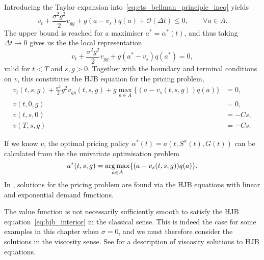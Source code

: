 \documentclass[main.tex]{subfiles}
\begin{document}
Introducing the Taylor expansion into~\eqref{eq:cts_bellman_principle_ineq}
yields
\begin{equation}
  v_t
  +{\textstyle\frac{\sigma^2g^2}{2}}
  v_{gg}+
  g(a-v_s)q(a)
  +\mathcal{O}(\Delta{t})\leq 0,\qquad \forall a\in A.
\end{equation}
The upper bound is reached for a maximiser $a^*=\alpha^*(t)$, and thus
taking $\Delta{t}\to 0$ gives us the the local representation
\begin{equation}
  v_t+\frac{\sigma^2g^2}{2}v_{gg}
  + g(a^*-v_s)q(a^*) = 0,
\end{equation}
valid for $t<T$ and $s,g>0$.
Together with the boundary and terminal conditions on
$v$, this constitutes the HJB equation for the pricing problem,
\begin{align}\label{eq:hjb_interior}
  v_t(t,s,g)+\frac{\sigma^2}{2} g^2v_{gg}(t,s,g)
  +g\max_{a\in A}\{(a-v_s(t,s,g))q(a)\} &= 0,\\ %
  v(t,0,g) &= 0,\\
  v(t,s,0) &= -Cs,\\
  v(T,s,g) &= -Cs.
\end{align}

If we know $v$, the optimal pricing policy
$\alpha^*(t)=a(t,S^{\alpha}(t),G(t))$
can be calculated
from the
the univariate optimisation problem
\begin{equation}\label{eq:pricing_function_general}
  a^*(t,s,g) = \operatorname*{arg\,max}_{a\in A}\{(a-v_s(t,s,g))q(a)\}.
\end{equation}
In , solutions for the
pricing problem are found via the HJB equations with linear and
exponential demand functions.
\begin{remark}\label{rem:viscosity}
  The value function is not necessarily sufficiently smooth to satisfy
  the HJB equation~\eqref{eq:hjb_interior} in the classical sense.
  This is indeed the case for some examples in this chapter when $\sigma=0$,
  and we must therefore consider
  the solutions in the viscosity sense. See \citet{pham2009continuous}
  for a description of viscosity solutions to HJB equations.
\end{remark}
\end{document}
